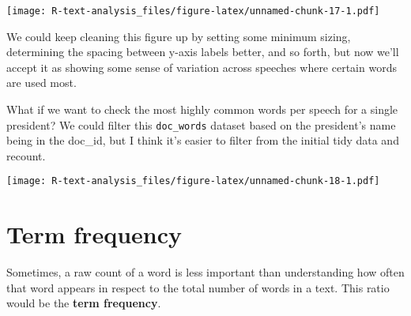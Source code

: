 \documentclass[]{book}
\newenvironment{Shaded}{\begin{snugshade}}{\end{snugshade}}
\newcommand{\DataTypeTok}[1]{\textcolor[rgb]{0.13,0.29,0.53}{#1}}
\newcommand{\DecValTok}[1]{\textcolor[rgb]{0.00,0.00,0.81}{#1}}
\newcommand{\KeywordTok}[1]{\textcolor[rgb]{0.13,0.29,0.53}{\textbf{#1}}}
\newcommand{\NormalTok}[1]{#1}
\newcommand{\OperatorTok}[1]{\textcolor[rgb]{0.81,0.36,0.00}{\textbf{#1}}}
\newcommand{\OtherTok}[1]{\textcolor[rgb]{0.56,0.35,0.01}{#1}}
\newcommand{\StringTok}[1]{\textcolor[rgb]{0.31,0.60,0.02}{#1}}
\begin{document}
\texttt{[image: R-text-analysis\_files/figure-latex/unnamed-chunk-17-1.pdf]}

We could keep cleaning this figure up by setting some minimum sizing, determining the spacing between y-axis labels better, and so forth, but now we'll accept it as showing some sense of variation across speeches where certain words are used most.

What if we want to check the most highly common words per speech for a single president? We could filter this \texttt{doc\_words} dataset based on the president's name being in the doc\_id, but I think it's easier to filter from the initial tidy data and recount.

\begin{Shaded}
\end{Shaded}

\texttt{[image: R-text-analysis\_files/figure-latex/unnamed-chunk-18-1.pdf]}

\hypertarget{term-frequency}{%
\section{Term frequency}\label{term-frequency}}

Sometimes, a raw count of a word is less important than understanding how often that word appears in respect to the total number of words in a text. This ratio would be the \textbf{term frequency}.
\end{document}
